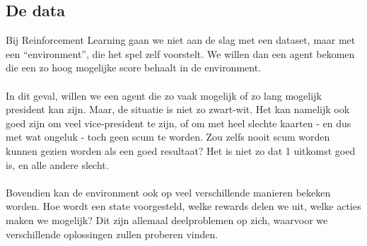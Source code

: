 \documentclass[11pt]{article}
\begin{document}
\subsection{De data}
Bij Reinforcement Learning gaan we niet aan de slag met een dataset, maar met een “environment”, die het spel zelf voorstelt. We willen dan een agent bekomen die een zo hoog mogelijke score behaalt in de environment. \\\\ 
In dit geval, willen we een agent die zo vaak mogelijk of zo lang mogelijk president kan zijn. Maar, de situatie is niet zo zwart-wit. Het kan namelijk ook goed zijn om veel vice-president te zijn, of om met heel slechte kaarten - en dus met wat ongeluk - toch geen scum te worden. Zou zelfs nooit scum worden kunnen gezien worden als een goed resultaat?  Het is niet zo dat 1 uitkomst goed is, en alle andere slecht. \\\\ 
Bovendien kan de environment ook op veel verschillende manieren bekeken worden. Hoe wordt een state voorgesteld, welke rewards delen we uit, welke acties maken we mogelijk? Dit zijn allemaal deelproblemen op zich, waarvoor we verschillende oplossingen zullen proberen vinden.
\end{document}
